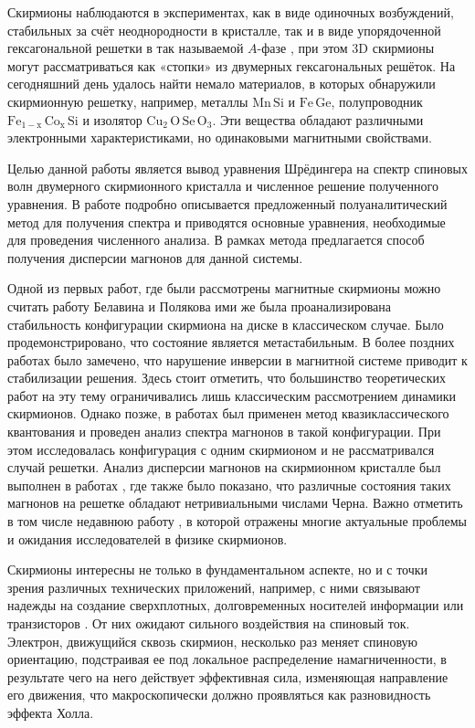 \documentclass[a4paper,article,14pt]{extarticle}
\begin{document}
Скирмионы наблюдаются в экспериментах, как в виде одиночных возбуждений, стабильных за счёт неоднородности в кристалле\cite{rosch_muller}, так и в виде упорядоченной гексагональной решетки в так называемой $A$-фазе \cite{muhlbauer}, при этом 3D скирмионы могут рассматриваться как «стопки» из двумерных гексагональных решёток.\cite{milde}
На сегодняшний день удалось найти немало материалов, в которых обнаружили скирмионную решетку, например, металлы $\mathrm{Mn\,Si}$ и $\mathrm{Fe\,Ge}$, полупроводник $\mathrm{Fe_{1-x}\,Co_x\,Si}$ \cite{munzer} и изолятор $\mathrm{Cu_2\,O\, Se\, O_3}$. Эти вещества обладают различными электронными характеристиками, но одинаковыми магнитными свойствами. \cite{nagaosa}



Целью данной работы является вывод уравнения Шрёдингера на спектр спиновых волн двумерного скирмионного кристалла и численное решение полученного уравнения. В работе подробно описывается предложенный полуаналитический метод для получения спектра и приводятся основные уравнения, необходимые для проведения численного анализа. В рамках метода предлагается способ получения дисперсии магнонов для данной системы.


Одной из первых работ, где были рассмотрены магнитные скирмионы можно считать работу Белавина и Полякова \cite{belavin} ими же была проанализирована стабильность конфигурации скирмиона на диске в классическом случае. Было продемонстрировано, что состояние является метастабильным. В более поздних работах было замечено, что нарушение инверсии в магнитной системе приводит к стабилизации решения.\cite{bogdanov} Здесь стоит отметить, что большинство теоретических работ на эту тему ограничивались лишь классическим рассмотрением динамики скирмионов.\cite{kiselevBogdanov} Однако позже, в работах  \cite{aristov1, garst} был применен метод квазиклассического квантования и проведен анализ спектра магнонов в такой конфигурации. При этом исследовалась конфигурация с одним скирмионом и не рассматривался случай решетки. Анализ дисперсии магнонов на скирмионном кристалле был выполнен в работах \cite{garst_2017, roldan}, где также было показано, что различные состояния таких магнонов на решетке обладают нетривиальными числами Черна. Важно отметить в том числе недавнюю работу \cite{back}, в которой отражены многие актуальные проблемы и ожидания исследователей в физике скирмионов.

Скирмионы интересны не только в фундаментальном аспекте, но и с точки зрения различных технических приложений, например, с ними связывают надежды на создание сверхплотных, долговременных носителей информации \cite{fert} или транзисторов \cite{zhang}. От них ожидают сильного воздействия на спиновый ток. Электрон, движущийся сквозь скирмион, несколько раз меняет спиновую ориентацию, подстраивая ее под локальное распределение намагниченности, в результате чего на него действует эффективная сила, изменяющая направление его движения, что макроскопически должно проявляться как разновидность эффекта Холла.\cite{rosch_pfleiderer}
\end{document}
